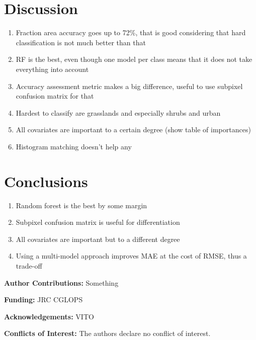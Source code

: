 \documentclass[a4paper,10pt]{article}
\newcommand{\minisection}[1]{\medskip \textbf{#1:}}
\begin{document}
\section{Discussion}

\begin{enumerate}
 \item Fraction area accuracy goes up to 72\%, that is good considering that hard classification is not much better than that
 \item RF is the best, even though one model per class means that it does not take everything into account
 \item Accuracy assessment metric makes a big difference, useful to use subpixel confusion matrix for that
 \item Hardest to classify are grasslands and especially shrubs and urban
 \item All covariates are important to a certain degree (show table of importances)
 \item Histogram matching doesn't help any
\end{enumerate}

\section{Conclusions}

\begin{enumerate}
 \item Random forest is the best by some margin
 \item Subpixel confusion matrix is useful for differentiation
 \item All covariates are important but to a different degree
 \item Using a multi-model approach improves MAE at the cost of RMSE, thus a trade-off
\end{enumerate}

\minisection{Author Contributions} Something

\minisection{Funding} JRC CGLOPS

\minisection{Acknowledgements} VITO

\minisection{Conflicts of Interest} The authors declare no conflict of interest.


\printnoidxglossary[type=acronym]
\end{document}
